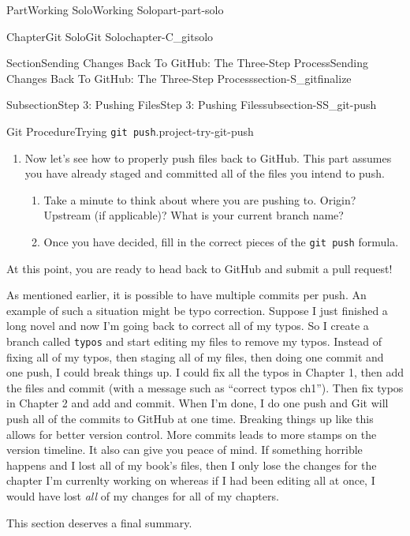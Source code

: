 \documentclass[oneside,10pt,]{book}
\newcommand{\mono}[1]{\texttt{#1}}
\begin{document}
\begin{partptx}{Part}{Working Solo}{}{Working Solo}{}{}{part-part-solo}
\begin{chapterptx}{Chapter}{Git Solo}{}{Git Solo}{}{}{chapter-C_gitsolo}
\begin{sectionptx}{Section}{Sending Changes Back To GitHub: The Three-Step Process}{}{Sending Changes Back To GitHub: The Three-Step Process}{}{}{section-S_gitfinalize}
\begin{subsectionptx}{Subsection}{Step 3: Pushing Files}{}{Step 3: Pushing Files}{}{}{subsection-SS_git-push}
\begin{project}{Git Procedure}{Trying \mono{git push}.}{project-try-git-push}
\begin{enumerate}[font=\bfseries,label=(\alph*),ref=\alph*]
\begin{enumerate}[font=\bfseries,label=(\roman*),ref=\theenumi.\roman*]%
\item{}What might happen if you forgot to specify the remote and branch? Let's find out: type \mono{git push} into the command line.%
\item{}What if you just forgot to specify the branch? Try \mono{git push origin}.%
\item{}What if you remembered the branch, but not the remote? Try \mono{git push country}%
\end{enumerate}%
\item{}Now let's see how to properly push files back to GitHub. This part assumes you have already staged and committed all of the files you intend to push.%
\begin{enumerate}[font=\bfseries,label=(\roman*),ref=\theenumi.\roman*]%
\item{}Take a minute to think about where you are pushing to. Origin? Upstream (if applicable)? What is your current branch name?%
\item{}Once you have decided, fill in the correct pieces of the \mono{git push} formula.%
\end{enumerate}%
\end{enumerate}%
At this point, you are ready to head back to GitHub and submit a pull request!%
\end{project}%
As mentioned earlier, it is possible to have multiple commits per push. An example of such a situation might be typo correction. Suppose I just finished a long novel and now I'm going back to correct all of my typos. So I create a branch called \mono{typos} and start editing my files to remove my typos. Instead of fixing all of my typos, then staging all of my files, then doing one commit and one push, I could break things up. I could fix all the typos in Chapter 1, then add the files and commit (with a message such as ``correct typos ch1''). Then fix typos in Chapter 2 and add and commit. When I'm done, I do one push and Git will push all of the commits to GitHub at one time. Breaking things up like this allows for better version control. More commits leads to more stamps on the version timeline. It also can give you peace of mind. If something horrible happens and I lost all of my book's files, then I only lose the changes for the chapter I'm currenlty working on whereas if I had been editing all at once, I would have lost \emph{all} of my changes for all of my chapters.%
\par
This section deserves a final summary.%

\end{subsectionptx}
\end{sectionptx}
\end{chapterptx}
\end{partptx}
\end{document}
